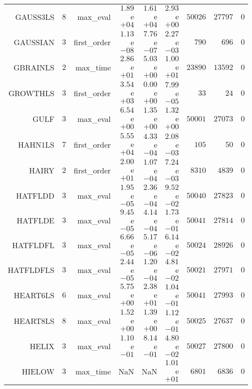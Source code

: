 \begin{longtable}{rrrrrrrrr}
GAUSS3LS & \(     8\) & max\_eval & \( 1.89\)e\(+04\) & \( 1.61\)e\(+04\) & \( 2.93\)e\(+00\) & \( 50026\) & \( 27797\) & \(     0\) \\
GAUSSIAN & \(     3\) & first\_order & \( 1.13\)e\(-08\) & \( 7.76\)e\(-07\) & \( 2.27\)e\(-03\) & \(   790\) & \(   696\) & \(     0\) \\
GBRAINLS & \(     2\) & max\_time & \( 2.86\)e\(+01\) & \( 5.03\)e\(+00\) & \( 1.00\)e\(+01\) & \( 23890\) & \( 13592\) & \(     0\) \\
GROWTHLS & \(     3\) & first\_order & \( 3.54\)e\(+03\) & \( 0.00\)e\(+00\) & \( 7.99\)e\(-05\) & \(    33\) & \(    24\) & \(     0\) \\
GULF & \(     3\) & max\_eval & \( 6.54\)e\(+00\) & \( 1.35\)e\(+00\) & \( 1.32\)e\(+00\) & \( 50001\) & \( 27073\) & \(     0\) \\
HAHN1LS & \(     7\) & first\_order & \( 5.55\)e\(+04\) & \( 4.33\)e\(-04\) & \( 2.08\)e\(-03\) & \(   105\) & \(    50\) & \(     0\) \\
HAIRY & \(     2\) & first\_order & \( 2.00\)e\(+01\) & \( 1.07\)e\(-04\) & \( 7.24\)e\(-03\) & \(  8310\) & \(  4839\) & \(     0\) \\
HATFLDD & \(     3\) & max\_eval & \( 1.95\)e\(-05\) & \( 2.36\)e\(-04\) & \( 9.52\)e\(-02\) & \( 50040\) & \( 27823\) & \(     0\) \\
HATFLDE & \(     3\) & max\_eval & \( 9.45\)e\(-05\) & \( 4.14\)e\(-04\) & \( 1.73\)e\(-01\) & \( 50041\) & \( 27814\) & \(     0\) \\
HATFLDFL & \(     3\) & max\_eval & \( 6.66\)e\(-05\) & \( 5.17\)e\(-06\) & \( 6.14\)e\(-02\) & \( 50024\) & \( 28926\) & \(     0\) \\
HATFLDFLS & \(     3\) & max\_eval & \( 2.44\)e\(-05\) & \( 1.20\)e\(-04\) & \( 4.81\)e\(-02\) & \( 50021\) & \( 27971\) & \(     0\) \\
HEART6LS & \(     6\) & max\_eval & \( 5.75\)e\(+00\) & \( 2.38\)e\(+01\) & \( 1.04\)e\(-01\) & \( 50041\) & \( 27993\) & \(     0\) \\
HEART8LS & \(     8\) & max\_eval & \( 1.52\)e\(+00\) & \( 1.39\)e\(+00\) & \( 1.12\)e\(-01\) & \( 50025\) & \( 27637\) & \(     0\) \\
HELIX & \(     3\) & max\_eval & \( 1.10\)e\(-01\) & \( 8.14\)e\(-01\) & \( 4.80\)e\(-02\) & \( 50027\) & \( 27800\) & \(     0\) \\
HIELOW & \(     3\) & max\_time &       NaN &       NaN & \( 1.01\)e\(+01\) & \(  6801\) & \(  6836\) & \(     0\) \\

\end{longtable}
